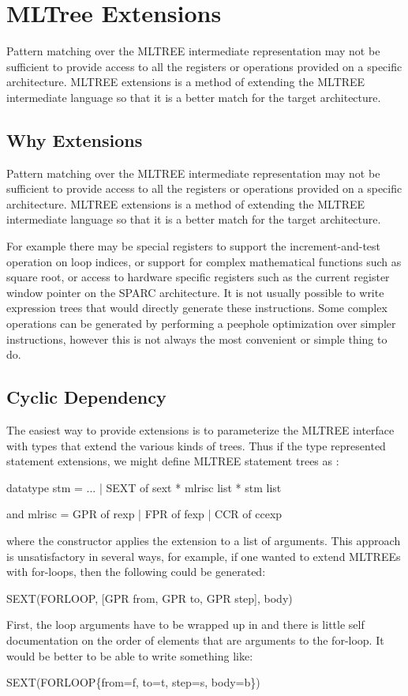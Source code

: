 \section{MLTree Extensions} \label{sec:mltree-extension}
	Pattern matching over the MLTREE intermediate representation
may not be sufficient to provide access to all the registers or
operations provided on a specific architecture. MLTREE extensions is a 
method of extending the MLTREE intermediate language so that it is a
better match for the target architecture.


\subsection{Why Extensions}

	Pattern matching over the MLTREE intermediate representation
may not be sufficient to provide access to all the registers or
operations provided on a specific architecture. MLTREE extensions is a 
method of extending the MLTREE intermediate language so that it is a
better match for the target architecture.

For example there may be special registers to support the
increment-and-test operation on loop indices, or 
support for complex mathematical functions such as
square root, or access to hardware specific registers such as the
current register window pointer on the SPARC architecture. It is not
usually possible to write expression trees that would directly
generate these instructions.
Some complex operations can be generated by performing a peephole
optimization over simpler instructions, however this is not always the 
most convenient or simple thing to do.

\subsection{Cyclic Dependency}

The easiest way to provide extensions is to parameterize the MLTREE
interface with types that extend the various kinds of trees. Thus if
the type  represented statement extensions, we might define
MLTREE statement trees as :
\begin{SML}
  datatype stm
    = ...
    | SEXT of sext * mlrisc list * stm list

  and mlrisc = GPR of rexp | FPR of fexp | CCR of ccexp
\end{SML}
where the constructor  applies the extension to a list of
arguments. This approach is unsatisfactory in several ways, for
example, if one wanted to extend MLTREEs with for-loops, then the
following could be generated:
\begin{SML}
  SEXT(FORLOOP, [GPR from, GPR to, GPR step], body)
\end{SML}	
First, the loop arguments have to be wrapped up in  and there
is little self documentation on the order of elements that are
arguments to the for-loop. It would be better to be able to write
something like:
\begin{SML}
  SEXT(FORLOOP\{from=f, to=t, step=s, body=b\}) 
\end{SML}

